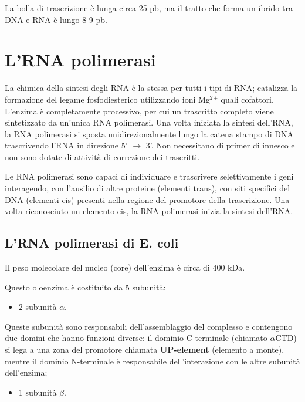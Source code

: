 \documentclass[11pt]{book}
\begin{document}
La bolla di trascrizione è lunga circa 25 pb, ma il tratto che forma un
ibrido tra DNA e RNA è lungo 8-9 pb.

\section{L'RNA polimerasi}\label{lrna-polimerasi}

La chimica della sintesi degli RNA è la stessa per tutti i tipi di RNA;
catalizza la formazione del legame fosfodiesterico utilizzando ioni
Mg\(^2\)\(^+\) quali cofattori. L'enzima è completamente processivo, per
cui un trascritto completo viene sintetizzato da un'unica RNA
polimerasi. Una volta iniziata la sintesi dell'RNA, la RNA polimerasi si
sposta unidirezionalmente lungo la catena stampo di DNA trascrivendo
l'RNA in direzione 5' \(\rightarrow\) 3'. Non necessitano di primer di
innesco e non sono dotate di attività di correzione dei trascritti.

Le RNA polimerasi sono capaci di individuare e trascrivere
selettivamente i geni interagendo, con l'ausilio di altre proteine
(elementi trans), con siti specifici del DNA (elementi cis) presenti
nella regione del promotore della trascrizione. Una volta riconosciuto
un elemento cis, la RNA polimerasi inizia la sintesi dell'RNA.

\subsection{L'RNA polimerasi di E.
coli}\label{lrna-polimerasi-di-e.-coli}

Il peso molecolare del nucleo (core) dell'enzima è circa di 400 kDa.

Questo oloenzima è costituito da 5 subunità:

\begin{itemize}
\itemsep1pt\parskip0pt
\item
  2 subunità \textbf{\(\alpha\)}.
\end{itemize}

Queste subunità sono responsabili dell'assemblaggio del complesso e
contengono due domini che hanno funzioni diverse: il dominio C-terminale
(chiamato \(\alpha\)CTD) si lega a una zona del promotore chiamata
\textbf{UP-element} (elemento a monte), mentre il dominio N-terminale è
responsabile dell'interazione con le altre subunità dell'enzima;

\begin{itemize}
\itemsep1pt\parskip0pt
\item
  1 subunità \textbf{\(\beta\)}.
\end{itemize}
\end{document}
